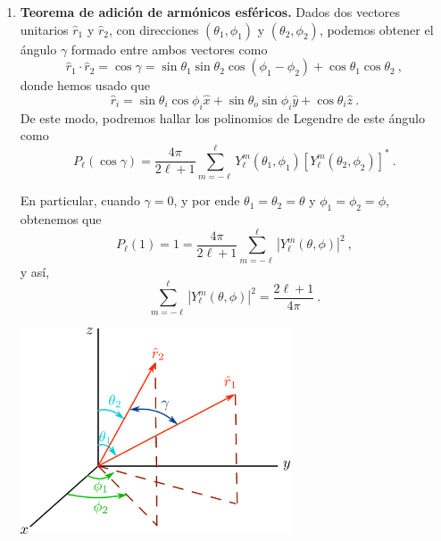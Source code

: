 \begin{propiedad}
\begin{enumerate}
        \item \textbf{Teorema de adición de armónicos esféricos.} Dados dos vectores unitarios $\hat{r}_1$ y $\hat{r}_2$, con direcciones $(\theta_1, \phi_1)$ y $(\theta_2, \phi_2)$, podemos obtener el ángulo $\gamma$ formado entre ambos vectores como
        \begin{equation}
            \hat{r}_1 \cdot \hat{r}_2 = \cos\gamma = \sin\theta_1 \sin\theta_2 \cos(\phi_1 - \phi_2) + \cos\theta_1 \cos\theta_2 \ ,
        \end{equation}
        donde hemos usado que
        \begin{equation*}
            \hat{r}_i = \sin \theta_i \cos \phi_i \hat{x} + \sin \theta_o \sin \phi_i \hat{y} + \cos \theta_i \hat{z} \ .
        \end{equation*}
        De este modo, podremos hallar los polinomios de Legendre de este ángulo como
        \begin{equation}
            P_\ell(\cos\gamma) = \frac{4\pi}{2\ell + 1} \sum_{m = -\ell}^\ell Y_\ell^m(\theta_1, \phi_1) \left[Y_\ell^m(\theta_2, \phi_2)\right]^\ast \ .
        \end{equation}
    
        En particular, cuando $\gamma=0$, y por ende $\theta_1 = \theta_2 = \theta$ y $\phi_1 = \phi_2 = \phi$, obtenemos que
        \begin{equation}
            P_\ell(1) = 1 = \frac{4\pi}{2\ell + 1} \sum_{m = -\ell}^\ell |Y_\ell^m(\theta, \phi)|^2 \ ,
        \end{equation}
        y así,
        \begin{equation}
            \sum_{m = -\ell}^\ell |Y_\ell^m(\theta, \phi)|^2 = \frac{2\ell + 1}{4\pi} \ .
        \end{equation}

        \begin{center}
            \includegraphics[width=8cm]{Figuras/Addition_Theorem.png}
        \end{center}
       
    
    \end{enumerate}
\end{propiedad}

